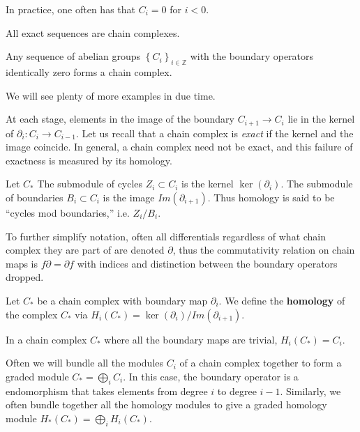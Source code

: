 In practice, one often has that $C_i = 0$ for $i<0$.


\begin{example} All exact sequences are chain complexes.
\end{example}

\begin{example} Any sequence of abelian groups $\left\{C_i\right\}_{i \in
\mathbb{Z}}$ with the boundary operators
identically zero forms a chain complex. 
\end{example}

We will see plenty of more examples in due time.

At each stage, elements in the image of the boundary $C_{i+1} \to C_i$ lie in
the kernel of $\partial_i: C_i \to C_{i-1}$. 	Let us recall that a chain
complex is \emph{exact} if the kernel and the image coincide. In general, a
chain complex need not be exact, and this failure of exactness is measured by
its homology.

\begin{definition} 
Let $C_*$
The submodule of cycles $Z_i\subset C_i$ is
the kernel $\ker(\partial_i)$. The submodule of boundaries
$B_i\subset C_i$ is the image $Im(\partial_{i+1})$. Thus
homology is said to be ``cycles mod boundaries,'' i.e.
$Z_i/B_i$.
\end{definition}

To further simplify notation, often all differentials regardless
of what chain complex they are part of are denoted $\partial$,
thus the commutativity relation on chain maps is
$f\partial=\partial f$ with indices and distinction between the
boundary operators dropped.


\begin{definition} Let $C_*$ be a chain complex with boundary
map $\partial_i$.
We define the \textbf{homology} of the complex $C_*$ via
$H_i(C_*)=\ker(\partial_i)/Im(\partial_{i+1})$.
\end{definition}

\begin{example} In a chain complex $C_*$ where all the boundary
maps are
trivial, $H_i(C_*)=C_i$. 
\end{example}

Often we will bundle all the modules $C_i$ of a chain complex
together to form a graded module $C_*=\bigoplus_i C_i$. In this
case, the boundary operator is a
endomorphism that takes elements from degree $i$ to degree
$i-1$. Similarly, we
often bundle together all the homology modules to give a graded
homology module
$H_*(C_*)=\bigoplus_i H_i(C_*)$.

